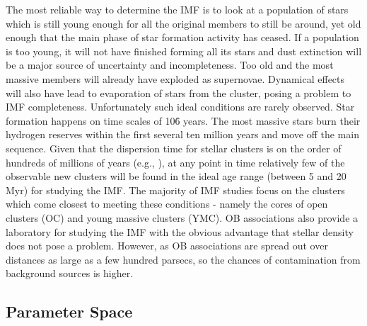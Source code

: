 The most reliable way to determine the IMF is to look at a population of stars which is still young enough for all the original members to still be around, yet old enough that the main phase of star formation activity has ceased. 
If a population is too young, it will not have finished forming all its stars and dust extinction will be a major source of uncertainty and incompleteness. Too old and the most massive members will already have exploded as supernovae. 
Dynamical effects will also have lead to evaporation of stars from the cluster, posing a problem to IMF completeness.
Unfortunately such ideal conditions are rarely observed. 
Star formation happens on time scales of 10\h6 years. 
The most massive stars burn their hydrogen reserves within the first several ten million years and move off the main sequence. 
Given that the dispersion time for stellar clusters is on the order of hundreds of millions of years (e.g., \citealt{Lada2003-ip}), at any point in time relatively few of the observable new clusters will be found in the ideal age range (between 5 and 20\,Myr) for studying the IMF. 
The majority of IMF studies focus on the clusters which come closest to meeting these conditions - namely the cores of open clusters (OC) and young massive clusters (YMC). 
OB associations also provide a laboratory for studying the IMF with the obvious advantage that stellar density does not pose a problem. However, as OB associations are spread out over distances as large as a few hundred parsecs, so the chances of contamination from background sources is higher. 


\subsection{Parameter Space}




